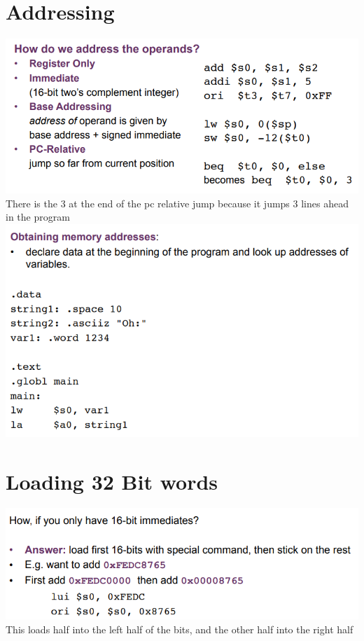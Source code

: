 \documentclass{article}[18pt]
\begin{document}
\section{Addressing}
\includegraphics[scale=0.7]{Addressing}\\
There is the 3 at the end of the pc relative jump because it jumps 3 lines ahead in the program\\
\includegraphics[scale=0.7]{Addressing1}
\section{Loading 32 Bit words}
\includegraphics[scale=0.7]{32-Bit}\\
This loads half into the left half of the bits, and the other half into the right half
\end{document}
